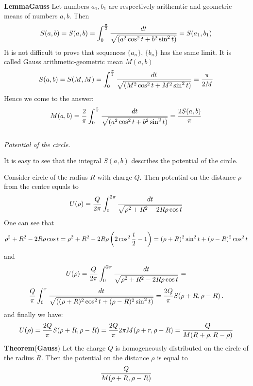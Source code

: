 {\bf Lemma}{{\bf Gauss}} Let numbers $a_1,b_1$ are respectively arithemtic and geometric means of numbers $a,b$.
Then
             $$
    S(a,b)=    S(a,b)=\int_0^{\pi\over 2}{dt\over \sqrt {(a^2\cos^2 t+b^2\sin^2 t)}}=S(a_1,b_1)
             $$
It is not difficult to prove that sequences $\{a_n\}$, $\{b_n\}$  has the same limit. It is called
Gauss arithmetic-geometric mean $M(a,b)$
      $$
   S(a,b)=S(M,M)=\int_0^{\pi\over 2}{dt\over \sqrt {(M^2\cos^2 t+M^2\sin^2 t)}}={\pi\over 2M}
      $$
Hence we come to the answer:
                   $$
           M(a,b)={2\over\pi}\int_0^{\pi\over 2}{dt\over \sqrt {(a^2\cos^2 t+b^2\sin^2 t)}}={2S(a,b)\over \pi}
                   $$

$$ $$

  {\it Potential of the circle.}

It is easy to see that the integral $S(a,b)$ describes the potential of the circle.

Consider circle of the radius $R$ with charge $Q$. Then potential on the distance $\rho$ from the centre equals
 to
           $$
 U(\rho)=   {Q\over 2\pi }
      \int_0^{2\pi}{dt\over \sqrt {\rho^2+R^2-2R\rho \cos t}}
           $$
 One can see that
         $$
         \rho^2+R^2-2R\rho \cos t=\rho^2+R^2-2R\rho \left(2\cos^2 {t\over 2}-1\right)=
         (\rho+R)^2\sin^2 t+(\rho-R)^2\cos^2 t
         $$
and
         $$
      U(\rho)=   {Q\over 2\pi }
      \int_0^{2\pi}{dt\over \sqrt {\rho^2+R^2-2R\rho \cos t}}=
                 $$
           $$
            {Q\over \pi }\int_0^{\pi}{dt\over \sqrt {((\rho+R)^2\cos^2 t+(\rho-R)^2\sin^2 t)}}=
       {2Q\over \pi }S(\rho+R,\rho-R)\,.
         $$
       and finally we have:
         $$
       U(\rho)={2Q\over \pi }S(\rho+R,\rho-R)={2Q\over \pi}{2\pi M(\rho+r,\rho-R)}={Q\over M(R+\rho,R-\rho)}
         $$
{\bf Theorem}({\bf Gauss}) Let the charge $Q$ is homogeneously distributed on the circle of the radius $R$.
Then the potential on the distance $\rho$ is equal to
           $$
         {Q\over M(\rho+R,\rho-R)}
           $$


  \bye
